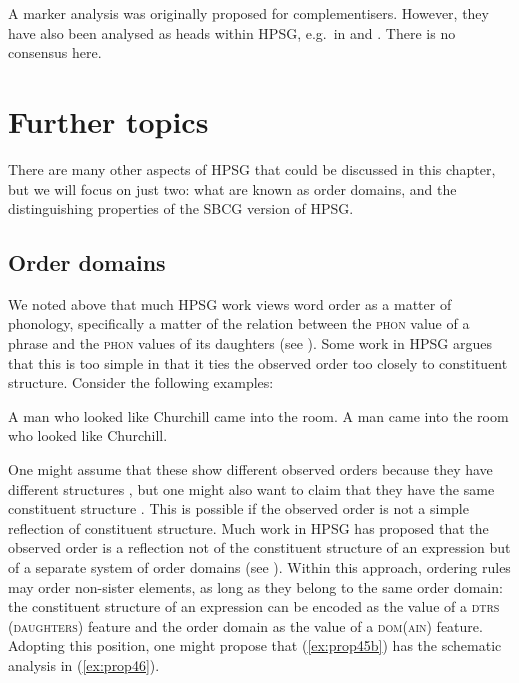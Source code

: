 \documentclass[output=paper,biblatex,babelshorthands,newtxmath,draftmode,colorlinks,citecolor=brown]{langscibook}
\begin{document}
A marker analysis was originally proposed for complementisers. However, they have also been analysed as heads within HPSG, e.g.\ in \citet[456--458]{Sag97a} and \citet[Section~2.8]{GSag2000a-u}. There is no consensus here.


\section{Further topics}\label{sec:prop7}
\label{prop:sec-further-topics}

There are many other aspects of HPSG that could be discussed in this chapter, but we will focus on just two: what are known as order domains, and the distinguishing properties of the SBCG version of HPSG.

\subsection{Order domains}\label{sec:prop7.1}

We noted above that much HPSG work views word order as a matter of phonology, specifically a matter of the relation between the \textsc{phon} value of a phrase and the \textsc{phon} values of its daughters (see ). Some work in HPSG argues that this is too simple in that it ties the observed order too closely to constituent structure. Consider the following examples:

\eal\label{ex:prop45}
\ex\label{ex:prop45a}
A man who looked like Churchill came into the room.
\ex\label{ex:prop45b}
A man came into the room who looked like Churchill.
\zl

\noindent
One might assume that these show different observed orders because they have different structures
\citep{Kiss2005a}, but one might also want to claim that they have the same constituent structure
\citep{KP95a}. This is possible if the observed order is not a simple reflection of constituent
structure. Much work in HPSG has proposed that the observed order is a reflection not of the
constituent structure of an expression but of a separate system of order domains (see
\citealp{Reape94a,Babel,Kathol2000a}). Within this approach, ordering rules may order non-sister
elements, as long as they belong to the same order domain: the constituent structure of an
expression can be encoded as the value of a \textsc{dtrs (daughters)} feature and the order domain
as the value of a \textsc{dom(ain)} feature. Adopting this position, one might propose that
(\ref{ex:prop45b}) has the schematic analysis in (\ref{ex:prop46}). 
\end{document}
